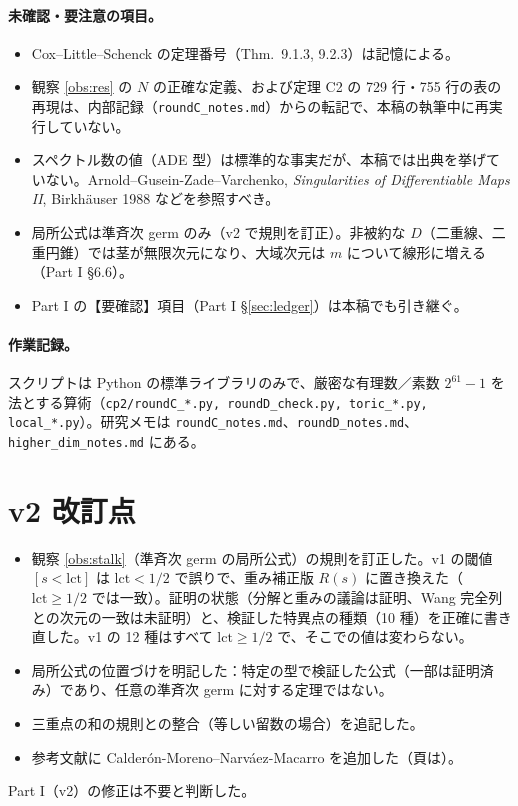 \paragraph{未確認・要注意の項目。}
\begin{itemize}
\item Cox--Little--Schenck の定理番号（Thm.\ 9.1.3, 9.2.3）は記憶による。\tQ
\item 観察 \ref{obs:res} の $N$ の正確な定義、および定理 C2 の 729 行・755 行の表の再現は、内部記録（\texttt{roundC\_notes.md}）からの転記で、本稿の執筆中に再実行していない。\tQ
\item スペクトル数の値（ADE 型）は標準的な事実だが、本稿では出典を挙げていない。Arnold--Gusein-Zade--Varchenko, \emph{Singularities of Differentiable Maps II}, Birkh\"auser 1988 などを参照すべき。\tQ
\item 局所公式は準斉次 germ のみ（v2 で規則を訂正）。非被約な $D$（二重線、二重円錐）では茎が無限次元になり、大域次元は $m$ について線形に増える（Part I \S6.6）。
\item Part I の【要確認】項目（Part I \S\ref{sec:ledger}）は本稿でも引き継ぐ。
\end{itemize}

\paragraph{作業記録。}スクリプトは Python の標準ライブラリのみで、厳密な有理数／素数 $2^{61}-1$ を法とする算術（\texttt{cp2/roundC\_*.py, roundD\_check.py, toric\_*.py, local\_*.py}）。研究メモは \texttt{roundC\_notes.md}、\texttt{roundD\_notes.md}、\texttt{higher\_dim\_notes.md} にある。


\section{v2 改訂点}\label{sec:rev}
\begin{itemize}
\item 観察 \ref{obs:stalk}（準斉次 germ の局所公式）の規則を訂正した。v1 の閾値 $[s<\mathrm{lct}]$ は $\mathrm{lct}<1/2$ で誤りで、重み補正版 $R(s)$ に置き換えた（$\mathrm{lct}\ge1/2$ では一致）。証明の状態（分解と重みの議論は証明、Wang 完全列との次元の一致は未証明）と、検証した特異点の種類（10 種）を正確に書き直した。v1 の 12 種はすべて $\mathrm{lct}\ge1/2$ で、そこでの値は変わらない。
\item 局所公式の位置づけを明記した：特定の型で検証した公式（一部は証明済み）であり、任意の準斉次 germ に対する定理ではない。
\item 三重点の和の規則との整合（等しい留数の場合）を追記した。
\item 参考文献に Calder\'on-Moreno--Narv\'aez-Macarro を追加した（頁は\tQ）。
\end{itemize}
Part I（v2）の修正は不要と判断した。

